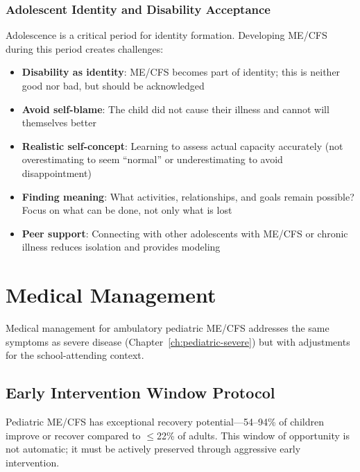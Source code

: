 \subsubsection{Adolescent Identity and Disability Acceptance}

Adolescence is a critical period for identity formation. Developing ME/CFS during this period creates challenges:

\begin{itemize}
    \item \textbf{Disability as identity}: ME/CFS becomes part of identity; this is neither good nor bad, but should be acknowledged
    \item \textbf{Avoid self-blame}: The child did not cause their illness and cannot will themselves better
    \item \textbf{Realistic self-concept}: Learning to assess actual capacity accurately (not overestimating to seem ``normal'' or underestimating to avoid disappointment)
    \item \textbf{Finding meaning}: What activities, relationships, and goals remain possible? Focus on what can be done, not only what is lost
    \item \textbf{Peer support}: Connecting with other adolescents with ME/CFS or chronic illness reduces isolation and provides modeling
\end{itemize}

\section{Medical Management}
\label{sec:ped-ambulatory-medical}

Medical management for ambulatory pediatric ME/CFS addresses the same symptoms as severe disease (Chapter~\ref{ch:pediatric-severe}) but with adjustments for the school-attending context.

\subsection{Early Intervention Window Protocol}
\label{subsec:ped-early-intervention}

Pediatric ME/CFS has exceptional recovery potential---54--94\% of children improve or recover compared to $\leq$22\% of adults. This window of opportunity is not automatic; it must be actively preserved through aggressive early intervention.

